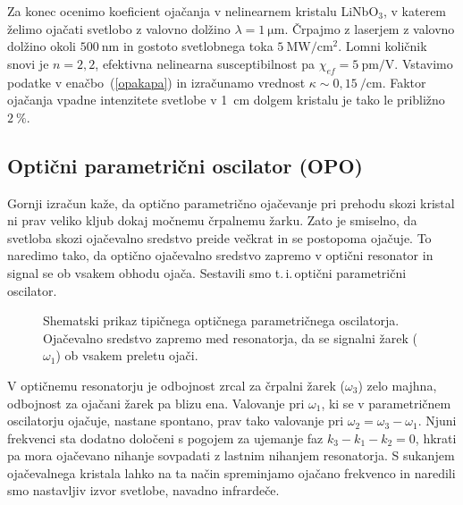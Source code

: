 Za konec ocenimo koeficient ojačanja v nelinearnem kristalu 
LiNbO$_{3}$, v katerem želimo
ojačati svetlobo z valovno dolžino $\lambda = 1~\si{\micro\metre}$. Črpajmo z laserjem z valovno dolžino 
okoli $500~\si{\nano\metre}$ in gostoto svetlobnega toka $5~\si{\mega\watt}/\si{\centi\metre}^{2}$. Lomni količnik snovi je 
$n = 2,2$, efektivna nelinearna susceptibilnost pa  $\chi_{ef} = 5~\si{\pico\metre}/\si{\volt}$. Vstavimo podatke v enačbo~(\ref{opakapa}) in izračunamo vrednost
$\kappa \sim 0,15~/\si{\centi\metre}$. Faktor ojačanja vpadne intenzitete svetlobe v 1~cm dolgem kristalu je 
tako le približno $2~\%$. 

\subsection*{Optični parametrični oscilator (OPO)}
Gornji izračun kaže, da optično parametrično ojačevanje pri prehodu skozi kristal ni prav veliko
kljub dokaj močnemu črpalnemu žarku. Zato je smiselno, da svetloba skozi ojačevalno 
sredstvo preide večkrat in se postopoma ojačuje. To naredimo tako, 
da optično ojačevalno sredstvo zapremo v optični 
resonator
in signal se ob vsakem obhodu ojača. Sestavili smo t.\,i.\,optični parametrični oscilator. 
\begin{figure}[h]
\centering
\def\svgwidth{100truemm} 

\caption{Shematski prikaz tipičnega optičnega parametričnega oscilatorja. Ojačevalno sredstvo
zapremo med resonatorja, da se signalni žarek ($\omega_1$) ob vsakem preletu ojači.}
\label{fig:opo}
\end{figure}

V optičnemu resonatorju je odbojnost zrcal za črpalni žarek ($\omega_3$) zelo majhna, 
odbojnost za ojačani žarek pa blizu ena. Valovanje pri $\omega_1$,
ki se v parametričnem oscilatorju ojačuje, nastane spontano, prav tako valovanje pri 
$\omega_2 = \omega_3 -\omega_1$. Njuni frekvenci sta dodatno določeni s pogojem za 
ujemanje faz $ k_3 - k_1 - k_2 = 0$, 
hkrati pa mora ojačevano nihanje sovpadati z lastnim nihanjem resonatorja. 
S sukanjem ojačevalnega kristala lahko na ta način spreminjamo
ojačano frekvenco in naredili smo nastavljiv izvor svetlobe, navadno infrardeče. 

